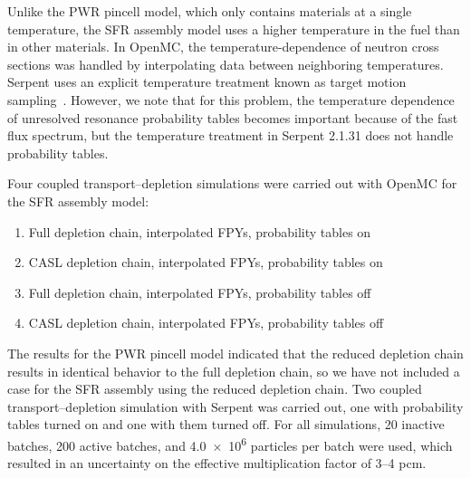 \documentclass[3p,authoryear]{elsarticle}
\begin{document}
Unlike the PWR pincell model, which only contains materials at a single
temperature, the SFR assembly model uses a higher temperature in the fuel than
in other materials. In OpenMC, the temperature-dependence of neutron cross
sections was handled by interpolating data between neighboring temperatures.
Serpent uses an explicit temperature treatment known as target motion
sampling~\citep{viitanen2012nse}. However, we note that for this problem, the
temperature dependence of unresolved resonance probability tables becomes
important because of the fast flux spectrum, but the temperature treatment in
Serpent 2.1.31 does not handle probability tables.

Four coupled transport--depletion simulations were carried out with OpenMC for
the SFR assembly model:
\begin{enumerate}
  \item Full depletion chain, interpolated FPYs, probability tables on
  \item CASL depletion chain, interpolated FPYs, probability tables on
  \item Full depletion chain, interpolated FPYs, probability tables off
  \item CASL depletion chain, interpolated FPYs, probability tables off
\end{enumerate}
The results for the PWR pincell model indicated that the reduced depletion chain
results in identical behavior to the full depletion chain, so we have not
included a case for the SFR assembly using the reduced depletion chain. Two
coupled transport--depletion simulation with Serpent was carried out, one with
probability tables turned on and one with them turned off. For all simulations,
20 inactive batches, 200 active batches, and \num{4.0e6} particles per batch
were used, which resulted in an uncertainty on the effective multiplication
factor of 3--4 pcm.

\end{document}
